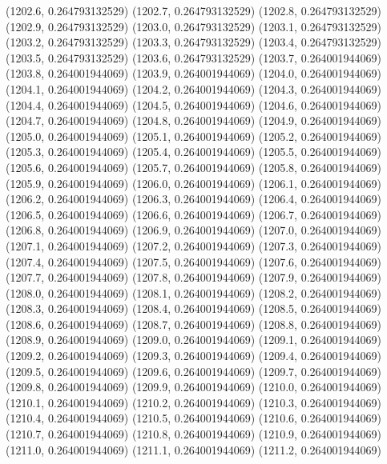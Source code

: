 {					(1202.6, 0.264793132529)
					(1202.7, 0.264793132529)
					(1202.8, 0.264793132529)
					(1202.9, 0.264793132529)
					(1203.0, 0.264793132529)
					(1203.1, 0.264793132529)
					(1203.2, 0.264793132529)
					(1203.3, 0.264793132529)
					(1203.4, 0.264793132529)
					(1203.5, 0.264793132529)
					(1203.6, 0.264793132529)
					(1203.7, 0.264001944069)
					(1203.8, 0.264001944069)
					(1203.9, 0.264001944069)
					(1204.0, 0.264001944069)
					(1204.1, 0.264001944069)
					(1204.2, 0.264001944069)
					(1204.3, 0.264001944069)
					(1204.4, 0.264001944069)
					(1204.5, 0.264001944069)
					(1204.6, 0.264001944069)
					(1204.7, 0.264001944069)
					(1204.8, 0.264001944069)
					(1204.9, 0.264001944069)
					(1205.0, 0.264001944069)
					(1205.1, 0.264001944069)
					(1205.2, 0.264001944069)
					(1205.3, 0.264001944069)
					(1205.4, 0.264001944069)
					(1205.5, 0.264001944069)
					(1205.6, 0.264001944069)
					(1205.7, 0.264001944069)
					(1205.8, 0.264001944069)
					(1205.9, 0.264001944069)
					(1206.0, 0.264001944069)
					(1206.1, 0.264001944069)
					(1206.2, 0.264001944069)
					(1206.3, 0.264001944069)
					(1206.4, 0.264001944069)
					(1206.5, 0.264001944069)
					(1206.6, 0.264001944069)
					(1206.7, 0.264001944069)
					(1206.8, 0.264001944069)
					(1206.9, 0.264001944069)
					(1207.0, 0.264001944069)
					(1207.1, 0.264001944069)
					(1207.2, 0.264001944069)
					(1207.3, 0.264001944069)
					(1207.4, 0.264001944069)
					(1207.5, 0.264001944069)
					(1207.6, 0.264001944069)
					(1207.7, 0.264001944069)
					(1207.8, 0.264001944069)
					(1207.9, 0.264001944069)
					(1208.0, 0.264001944069)
					(1208.1, 0.264001944069)
					(1208.2, 0.264001944069)
					(1208.3, 0.264001944069)
					(1208.4, 0.264001944069)
					(1208.5, 0.264001944069)
					(1208.6, 0.264001944069)
					(1208.7, 0.264001944069)
					(1208.8, 0.264001944069)
					(1208.9, 0.264001944069)
					(1209.0, 0.264001944069)
					(1209.1, 0.264001944069)
					(1209.2, 0.264001944069)
					(1209.3, 0.264001944069)
					(1209.4, 0.264001944069)
					(1209.5, 0.264001944069)
					(1209.6, 0.264001944069)
					(1209.7, 0.264001944069)
					(1209.8, 0.264001944069)
					(1209.9, 0.264001944069)
					(1210.0, 0.264001944069)
					(1210.1, 0.264001944069)
					(1210.2, 0.264001944069)
					(1210.3, 0.264001944069)
					(1210.4, 0.264001944069)
					(1210.5, 0.264001944069)
					(1210.6, 0.264001944069)
					(1210.7, 0.264001944069)
					(1210.8, 0.264001944069)
					(1210.9, 0.264001944069)
					(1211.0, 0.264001944069)
					(1211.1, 0.264001944069)
					(1211.2, 0.264001944069)
}
